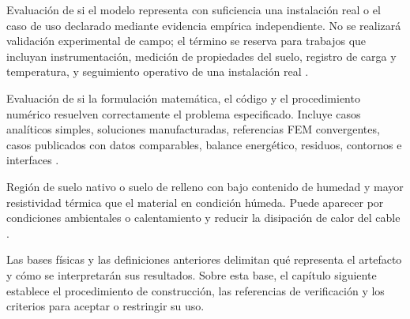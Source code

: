 \begin{description}[style=nextline,itemsep=0.5\baselineskip,parsep=0pt,topsep=0.25\baselineskip]
  \item[Validación.] Evaluación de si el modelo representa con suficiencia una instalación real o el caso de uso declarado mediante evidencia empírica independiente. No se realizará validación experimental de campo; el término se reserva para trabajos que incluyan instrumentación, medición de propiedades del suelo, registro de carga y temperatura, y seguimiento operativo de una instalación real \parencites{cigre2022}[93--99]{cigre2025}[350--351]{gregor2013}.

  \item[Verificación.] Evaluación de si la formulación matemática, el código y el procedimiento numérico resuelven correctamente el problema especificado. Incluye casos analíticos simples, soluciones manufacturadas, referencias FEM convergentes, casos publicados con datos comparables, balance energético, residuos, contornos e interfaces \parencites{cigre2022}[3--4,93--99]{cigre2025}[350--351]{gregor2013}.

  \item[Zona seca.] Región de suelo nativo o suelo de relleno con bajo contenido de humedad y mayor resistividad térmica que el material en condición húmeda. Puede aparecer por condiciones ambientales o calentamiento y reducir la disipación de calor del cable \parencites[4--6]{enescu2021}[1,6--9]{khumalo2025}[14851--14852]{fariz2026}.
\end{description}
\endgroup

Las bases físicas y las definiciones anteriores delimitan qué representa el artefacto y cómo se interpretarán sus resultados. Sobre esta base, el capítulo siguiente establece el procedimiento de construcción, las referencias de verificación y los criterios para aceptar o restringir su uso.

